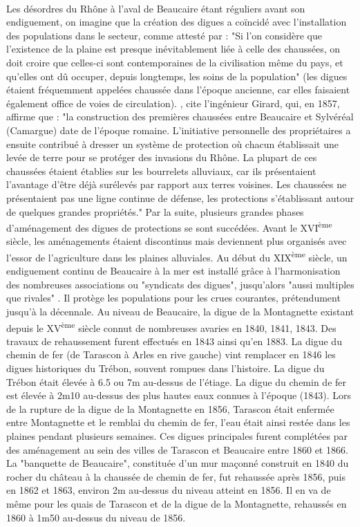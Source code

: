 \documentclass[11pt]{article}
\begin{document}
		\paragraph{} Les désordres du Rhône à l'aval de Beaucaire étant réguliers avant son endiguement, on imagine que la création des digues a coïncidé avec l'installation des populations dans le secteur, comme attesté par \citet{surell_memoire_1847} : "Si l'on considère que l'existence de la plaine est presque inévitablement liée à celle des chaussées, on doit croire que celles-ci sont contemporaines de la civilisation même du pays, et qu'elles ont dû occuper, depuis longtemps, les soins de la population" (les digues étaient fréquemment appelées chaussée dans l'époque ancienne, car elles faisaient également office de voies de circulation). \citet{mejean_etude_2017}, cite l'ingénieur Girard, qui, en 1857, affirme que : "la construction des premières chaussées entre Beaucaire et Sylvéréal (Camargue) date de l'époque romaine. L'initiative personnelle des propriétaires a ensuite contribué à dresser un système de protection où chacun établissait une levée de terre pour se protéger des invasions du Rhône. La plupart de ces chaussées étaient établies sur les bourrelets alluviaux, car ils présentaient l'avantage d'être déjà surélevés par rapport aux terres voisines. Les chaussées ne présentaient pas une ligne continue de défense, les protections s'établissant autour de quelques grandes propriétés." Par la suite, plusieurs grandes phases d'aménagement des digues de protections se sont succédées. Avant le XVI\textsuperscript{ème} siècle, les aménagements étaient discontinus mais deviennent plus organisés avec l'essor de l'agriculture dans les plaines alluviales. Au début du XIX\textsuperscript{ème} siècle, un endiguement continu de Beaucaire à la mer est installé grâce à l'harmonisation des nombreuses associations ou "syndicats des digues", jusqu'alors "aussi multiples que rivales" \citep{pichard_sept_2014}. Il protège les populations pour les crues courantes, prétendument jusqu'à la décennale. Au niveau de Beaucaire, la digue de la Montagnette existant depuis le XV\textsuperscript{ème} siècle connut de nombreuses avaries en 1840, 1841, 1843. Des travaux de rehaussement furent effectués en 1843 ainsi qu'en 1883. La digue du chemin de fer (de Tarascon à Arles en rive gauche) vint remplacer en 1846 les digues historiques du Trébon, souvent rompues dans l'histoire. La digue du Trébon était élevée à 6.5 ou 7m au-dessus de l'étiage. La digue du chemin de fer est élevée à 2m10 au-dessus des plus hautes eaux connues à l'époque (1843). Lors de la rupture de la digue de la Montagnette en 1856, Tarascon était enfermée entre Montagnette et le remblai du chemin de fer, l'eau était ainsi restée dans les plaines pendant plusieurs semaines. Ces digues principales furent complétées par des aménagement au sein des villes de Tarascon et Beaucaire entre 1860 et 1866. La "banquette de Beaucaire", constituée d'un mur maçonné construit en 1840 du rocher du château à la chaussée de chemin de fer, fut rehaussée après 1856, puis en 1862 et 1863, environ 2m au-dessus du niveau atteint en 1856. Il en va de même pour les quais de Tarascon et de la digue de la Montagnette, rehaussés en 1860 à 1m50 au-dessus du niveau de 1856.
		
\end{document}
